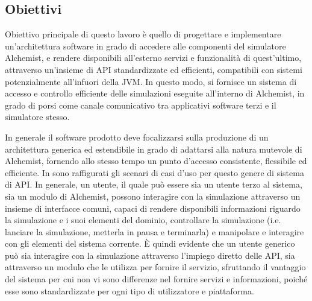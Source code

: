 \subsection{Obiettivi}\label{ssec:objectives}
Obiettivo principale di questo lavoro è quello di progettare e implementare un'architettura software in grado di accedere alle componenti del simulatore Alchemist, e rendere disponibili all'esterno
servizi e funzionalità di quest'ultimo, attraverso un'insieme di API standardizzate ed efficienti, compatibili con sistemi potenzialmente all'infuori della \ac{JVM}. In questo modo, si fornisce un
sistema di accesso e controllo efficiente delle simulazioni eseguite all'interno di Alchemist, in grado di porsi come canale comunicativo tra applicativi software terzi e il simulatore stesso.

In generale il software prodotto deve focalizzarsi sulla produzione di un architettura generica ed estendibile in grado di adattarsi alla natura mutevole di Alchemist, fornendo allo stesso tempo
un punto d'accesso consistente, flessibile ed efficiente. In  sono raffigurati gli scenari di casi d'uso per questo genere di sistema di \ac{API}.
%
In generale, un utente, il quale può essere sia un utente terzo al sistema, sia un modulo di Alchemist, possono interagire con la simulazione attraverso un insieme di interfacce comuni, capaci di
rendere disponibili informazioni riguardo la simulazione e i suoi elementi del dominio, controllare la simulazione (i.e. lanciare la simulazione, metterla in pausa e terminarla) e manipolare e interagire
con gli elementi del sistema corrente. È quindi evidente che un utente generico può sia interagire con la simulazione attraverso l'impiego diretto delle \ac{API}, sia attraverso un modulo che le
utilizza per fornire il servizio, sfruttando il vantaggio del sistema per cui non vi sono differenze nel fornire servizi e informazioni, poiché esse sono standardizzate per ogni tipo di utilizzatore e 
piattaforma.

